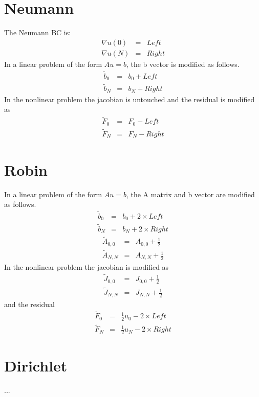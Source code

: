 \documentclass[12pt]{article}
\begin{document}
\maketitle
\section{Neumann}
The Neumann BC is:
\begin{eqnarray}
\nabla u(0) & = & Left \\
\nabla u(N) & = & Right
\end{eqnarray}
In a linear problem of the form $A u = b$, the b vector is modified as follows.
\begin{eqnarray}
\tilde{b}_0 & = & b_0 + Left\\
\tilde{b}_N & = & b_N + Right
\end{eqnarray}
In the nonlinear problem the jacobian is untouched and the residual is modified as
\begin{eqnarray}
\tilde{F}_0 & = & F_0 - Left\\ 
\tilde{F}_N & = & F_N - Right 
\end{eqnarray}
\section{Robin}
In a linear problem of the form $A u = b$, the A matrix and b vector are modified as follows.
\begin{eqnarray}
\tilde{b}_0 & = & b_0 + 2\times Left\\
\tilde{b}_N & = & b_N + 2\times Right
\end{eqnarray}
\begin{eqnarray}
\tilde{A}_{0,0} & = & A_{0,0} + \frac{1}{2}\\
\tilde{A}_{N,N} & = & A_{N,N} + \frac{1}{2}
\end{eqnarray}
In the nonlinear problem the jacobian is modified as
\begin{eqnarray}
\tilde{J}_{0,0} & = & J_{0,0} + \frac{1}{2}\\
\tilde{J}_{N,N} & = & J_{N,N} + \frac{1}{2}
\end{eqnarray}
and the residual
\begin{eqnarray}
\tilde{F}_{0} & = & \frac{1}{2} u_0 - 2\times Left\\
\tilde{F}_{N} & = & \frac{1}{2} u_N - 2\times Right
\end{eqnarray}
\section{Dirichlet}
...
\end{document}
